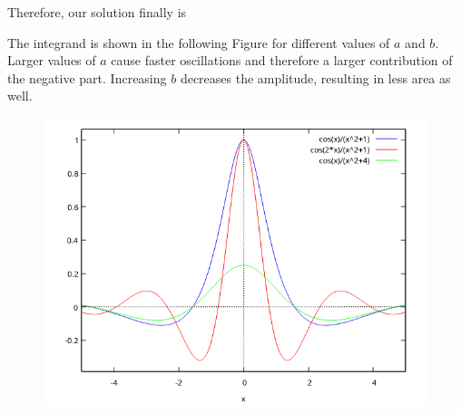 Therefore, our solution finally is

\bee
{}
\eee

The integrand is shown in the following Figure for different values of $a$ and $b$. Larger values of $a$ cause faster oscillations and therefore a larger contribution of the negative part. Increasing $b$ decreases the amplitude, resulting in less area as well.

\begin{figure}[H]
    \includegraphics[scale=0.7]{images/2022-03-21_plot_5.png}
\end{figure}



